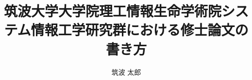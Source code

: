 \title{筑波大学大学院理工情報生命学術院システム情報工学研究群における修士論文の書き方}
\author{筑波 太郎}
  

\maketitle
\thispagestyle{empty}
\newpage